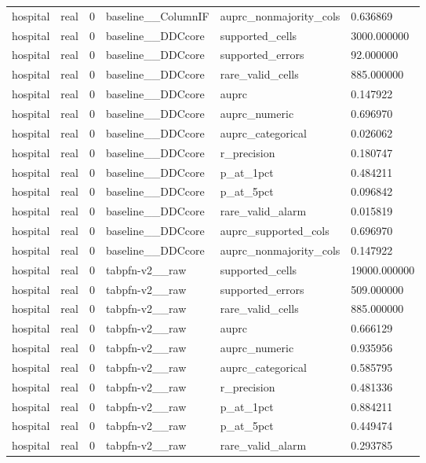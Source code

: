 \begin{tabular}{llllll}
hospital & real & 0 & baseline\_\_ColumnIF & auprc\_nonmajority\_cols & 0.636869 \\
hospital & real & 0 & baseline\_\_DDCcore & supported\_cells & 3000.000000 \\
hospital & real & 0 & baseline\_\_DDCcore & supported\_errors & 92.000000 \\
hospital & real & 0 & baseline\_\_DDCcore & rare\_valid\_cells & 885.000000 \\
hospital & real & 0 & baseline\_\_DDCcore & auprc & 0.147922 \\
hospital & real & 0 & baseline\_\_DDCcore & auprc\_numeric & 0.696970 \\
hospital & real & 0 & baseline\_\_DDCcore & auprc\_categorical & 0.026062 \\
hospital & real & 0 & baseline\_\_DDCcore & r\_precision & 0.180747 \\
hospital & real & 0 & baseline\_\_DDCcore & p\_at\_1pct & 0.484211 \\
hospital & real & 0 & baseline\_\_DDCcore & p\_at\_5pct & 0.096842 \\
hospital & real & 0 & baseline\_\_DDCcore & rare\_valid\_alarm & 0.015819 \\
hospital & real & 0 & baseline\_\_DDCcore & auprc\_supported\_cols & 0.696970 \\
hospital & real & 0 & baseline\_\_DDCcore & auprc\_nonmajority\_cols & 0.147922 \\
hospital & real & 0 & tabpfn-v2\_\_raw & supported\_cells & 19000.000000 \\
hospital & real & 0 & tabpfn-v2\_\_raw & supported\_errors & 509.000000 \\
hospital & real & 0 & tabpfn-v2\_\_raw & rare\_valid\_cells & 885.000000 \\
hospital & real & 0 & tabpfn-v2\_\_raw & auprc & 0.666129 \\
hospital & real & 0 & tabpfn-v2\_\_raw & auprc\_numeric & 0.935956 \\
hospital & real & 0 & tabpfn-v2\_\_raw & auprc\_categorical & 0.585795 \\
hospital & real & 0 & tabpfn-v2\_\_raw & r\_precision & 0.481336 \\
hospital & real & 0 & tabpfn-v2\_\_raw & p\_at\_1pct & 0.884211 \\
hospital & real & 0 & tabpfn-v2\_\_raw & p\_at\_5pct & 0.449474 \\
hospital & real & 0 & tabpfn-v2\_\_raw & rare\_valid\_alarm & 0.293785 \\

\end{tabular}
